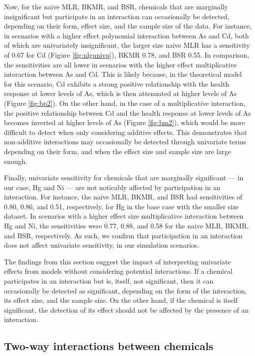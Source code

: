 \documentclass[12pt, twoside]{amherstthesis}
\begin{document}
Now, for the naive MLR, BKMR, and BSR, chemicals that are marginally insignificant but participate in an interaction can occasionally be detected, depending on their form, effect size, and the sample size of the data. For instance, in scenarios with a higher effect polynomial interaction between As and Cd, both of which are univariately insignificant, the larger size naive MLR has a sensitivity of 0.67 for Cd (Figure \ref{fig:nlgunivp}), BKMR 0.78, and BSR 0.55. In comparison, the sensitivities are all lower in scenarios with the higher effect multiplicative interaction between As and Cd. This is likely because, in the theoretical model for this scenario, Cd exhibits a strong positive relationship with the health response at lower levels of As, which is then attenuated at higher levels of As (Figure \ref{fig:bp2}). On the other hand, in the case of a multiplicative interaction, the positive relationship between Cd and the health response at lower levels of As becomes inverted at higher levels of As (Figure \ref{fig:bm2}), which would be more difficult to detect when only considering additive effects. This demonstrates that non-additive interactions may occasionally be detected through univariate terms depending on their form, and when the effect size and sample size are large enough.

Finally, univariate sensitivity for chemicals that are marginally significant --- in our case, Hg and Ni --- are not noticably affected by participation in an interaction. For instance, the naive MLR, BKMR, and BSR had sensitivities of 0.80, 0.86, and 0.51, respectively, for Hg in the base case with the smaller size dataset. In scenarios with a higher effect size multiplicative interaction between Hg and Ni, the sensitivities were 0.77, 0.88, and 0.58 for the naive MLR, BKMR, and BSR, respectively. As such, we confirm that participation in an interaction does not affect univariate sensitivity, in our simulation scenarios.

The findings from this section suggest the impact of interpreting univariate effects from models without considering potential interactions. If a chemical participates in an interaction but is, itself, not significant, then it can occasionally be detected as significant, depending on the form of the interaction, its effect size, and the sample size. On the other hand, if the chemical is itself significant, the detection of its effect should not be affected by the presence of an interaction.

\hypertarget{two-way-interactions-between-chemicals}{%
\subsection{Two-way interactions between chemicals}\label{two-way-interactions-between-chemicals}}
\end{document}

